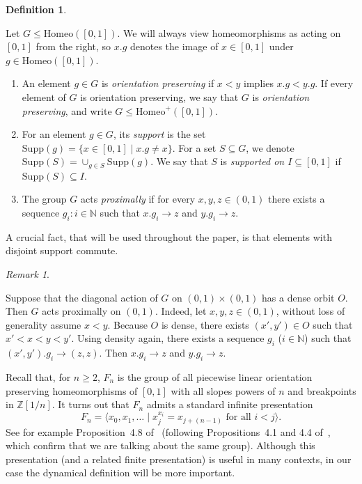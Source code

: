 \documentclass[10pt,a4paper]{article}
\theoremstyle{definition}
\newtheorem{defi}[cdrthm]{Definition}
\theoremstyle{remark}
\newtheorem{rema}[cdrthm]{Remark}
\newcommand{\N}{\mathbb{N}}
\newcommand{\Z}{\mathbb{Z}}
\newcommand{\Homeo}{\mathrm{Homeo}}
\newcommand{\Supp}{\mathrm{Supp}}
\theoremstyle{plain}
\begin{document}
\begin{defi}
\label{def:dynamical}

Let $G \leq \Homeo([0, 1])$. We will always view homeomorphisms as acting on $[0,1]$ from the right, so $x.g$ denotes the image of $x\in [0,1]$ under $g\in\Homeo([0,1])$.
\begin{enumerate}
\item An element $g \in G$ is \emph{orientation preserving} if $x < y$ implies $x.g < y.g$. If every element of $G$ is orientation preserving, we say that $G$ is \emph{orientation preserving}, and write $G \leq \Homeo^+([0, 1])$.
\item For an element $g \in G$, its \emph{support} is the set $\Supp(g) = \{ x \in [0, 1] \mid x.g \neq x \}$. For a set $S \subseteq G$, we denote $\Supp(S) = \cup_{g \in S} \Supp(g)$. We say that $S$ is \emph{supported on $I \subseteq [0, 1]$} if $\Supp(S) \subseteq I$.
\item The group $G$ acts \emph{proximally} if for every $x, y, z \in (0, 1)$ there exists a sequence $g_i : i \in \N$ such that $x.g_i \to z$ and $y.g_i \to z$.
\end{enumerate}
\end{defi}

A crucial fact, that will be used throughout the paper, is that elements with disjoint support commute.

\begin{rema}
\label{rem:proximal}

Suppose that the diagonal action of $G$ on $(0, 1) \times (0, 1)$ has a dense orbit $O$. Then $G$ acts proximally on $(0, 1)$. Indeed, let $x, y, z \in (0, 1)$, without loss of generality assume $x < y$. Because $O$ is dense, there exists $(x', y') \in O$ such that $x' < x < y < y'$. Using density again, there exists a sequence $g_i$ ($i \in \N$) such that $(x', y').g_i \to (z, z)$. Then $x.g_i \to z$ and $y.g_i \to z$.
\end{rema}

Recall that, for $n\ge 2$, $F_n$ is the group of all piecewise linear orientation preserving homeomorphisms of $[0,1]$ with all slopes powers of $n$ and breakpoints in $\Z[1/n]$. It turns out that $F_n$ admits a standard infinite presentation
\[
F_n=\langle x_0,x_1,\dots\mid x_j^{x_i} = x_{j+(n-1)} \text{ for all } i<j\rangle \text{.}
\]
See for example Proposition~4.8 of~\cite{brown87} (following Propositions~4.1 and 4.4 of~\cite{brown87}, which confirm that we are talking about the same group). Although this presentation (and a related finite presentation) is useful in many contexts, in our case the dynamical definition will be more important.
\end{document}
